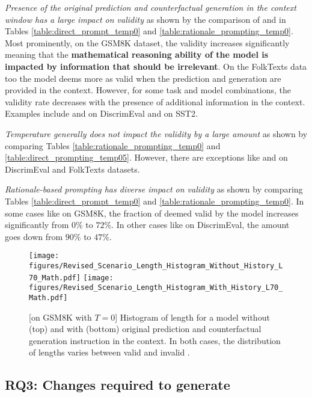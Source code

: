 \textit{Presence of the original prediction and counterfactual generation in the context window has a large impact on validity} as shown by the comparison of \Val and \ValH in Tables \ref{table:direct_prompt_temp0} and \ref{table:rationale_prompting_temp0}. Most prominently, on the GSM8K dataset, the validity increases significantly meaning that the \textbf{mathematical reasoning ability of the model is impacted by information that should be irrelevant}. On the FolkTexts data too the model deems more \SCEs as valid when the prediction and \SCE generation are provided in the context. However, for some task and model combinations, the validity rate decreases with the presence of additional information in the context. Examples include \llamaS and \llamaM on DiscrimEval and \llamaS on SST2.

\textit{Temperature generally does not impact the \SCE validity by a large amount} as shown by comparing Tables \ref{table:rationale_prompting_temp0} and \ref{table:direct_prompting_temp05}. However, there are exceptions like \llamaS and \llamaM on DiscrimEval and FolkTexts datasets.

\textit{Rationale-based prompting has diverse impact on \SCE validity} as shown by comparing Tables \ref{table:direct_prompt_temp0} and \ref{table:rationale_prompting_temp0}. In some cases like \mistralM on GSM8K, the fraction of \SCEs deemed valid by the model increases significantly from $0\%$ to $72\%$.  In other cases like \llamaM on DiscrimEval, the amount goes down from $90\%$ to $47\%$.


\begin{figure}[!hbt]
    \centering
    \texttt{[image: figures/Revised\_Scenario\_Length\_Histogram\_Without\_History\_L70\_Math.pdf]}
    \vfill
    \texttt{[image: figures/Revised\_Scenario\_Length\_Histogram\_With\_History\_L70\_Math.pdf]}
    \caption{[\llamaM on GSM8K with $T=0$] Histogram of \SCE length for a model without (top) and with (bottom) original prediction and counterfactual generation instruction in the context. In both cases, the distribution of lengths varies between valid and invalid \SCEs.}
    \label{fig:length_hist_llama70_gsm8k_temp0}
\end{figure}




\subsection*{RQ3: Changes required to generate \SCEs}


